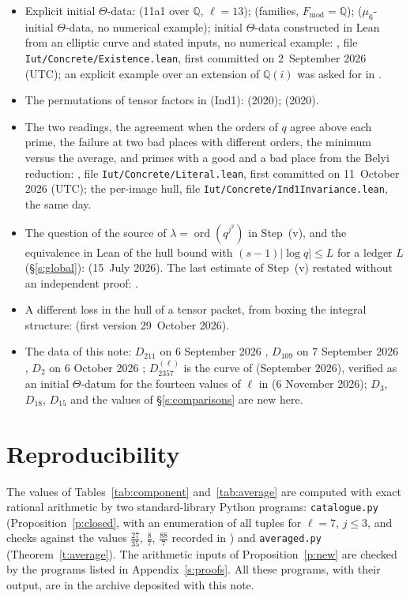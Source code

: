 \documentclass[11pt]{amsart}
\theoremstyle{remark}
\newcommand{\Q}{\mathbb Q}
\newcommand{\Fmod}{F_{\mathrm{mod}}}
\begin{document}
\begin{itemize}
\item Explicit initial $\Theta$-data: \cite[\S2.10]{DH1} (11a1 over $\Q$, $\ell=13$); \cite{Zhou1,Zhou2} (families,
$\Fmod=\Q$); \cite[Def.~4.1]{MFHMP} ($\mu_6$-initial $\Theta$-data, no numerical example); initial $\Theta$-data
constructed in Lean from an elliptic curve and stated inputs, no numerical example: \cite{LANAiut}, file
\nolinkurl{Iut/Concrete/Existence.lean}, first committed on 2~September 2026 (UTC); an explicit example over an
extension of $\Q(i)$ was asked for in \cite{MO}.
\item The permutations of tensor factors in (Ind1): \cite[\S4]{DH1} (2020); \cite[\S6.2, footnote~7]{DH} (2020).
\item The two readings, the agreement when the orders of $q$ agree above each prime, the failure at two bad places with
different orders, the minimum versus the average, and primes with a good and a bad place from the Belyi reduction:
\cite{LANAiut}, file \nolinkurl{Iut/Concrete/Literal.lean}, first committed on 11~October 2026 (UTC); the per-image hull,
file \nolinkurl{Iut/Concrete/Ind1Invariance.lean}, the same day.
\item The question of the source of $\lambda=\operatorname{ord}(q^{j^2})$ in Step~(v), and the equivalence in Lean of the
hull bound with $(s-1)|\log q|\le L$ for a ledger $L$ (\S\ref{s:global}): \cite{Takkun} (15~July 2026). The last
estimate of Step~(v) restated without an independent proof: \cite[Prop.~6.10.9]{JoshiIV}.
\item A different loss in the hull of a tensor packet, from boxing the integral structure: \cite{Zeng} (first version 29~October 2026).
\item The data of this note: $D_{211}$ on 6 September 2026 \cite{First}, $D_{109}$ on 7 September 2026 \cite{Second},
$D_2$ on 6 October 2026 \cite{NoteV1}; $D_{2357}^{(\ell)}$ is the curve of \cite[\S13]{Second} (September 2026),
verified as an initial $\Theta$-datum for the fourteen values of $\ell$ in \cite{Fourteen} (6 November 2026); $D_3$,
$D_{18}$, $D_{15}$ and the values of \S\ref{s:comparisons} are new here.
\end{itemize}

\section{Reproducibility}\label{s:repro}

The values of Tables~\ref{tab:component} and~\ref{tab:average} are computed with exact rational arithmetic by two
standard-library Python programs: \texttt{catalogue.py} (Proposition~\ref{p:closed}, with an enumeration of all tuples
for $\ell=7$, $j\le3$, and checks against the values $\tfrac{27}{35}$, $\tfrac87$, $\tfrac{88}7$ recorded in
\cite{Note,First}) and \texttt{averaged.py} (Theorem~\ref{t:average}). The arithmetic inputs of
Proposition~\ref{p:new} are checked by the programs listed in Appendix~\ref{s:proofs}. All these programs, with
their output, are in the archive deposited with this note.
\end{document}
